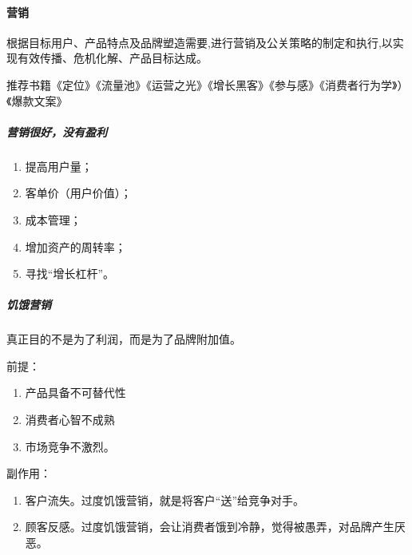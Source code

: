 \documentclass[letterpaper,10pt,english]{sphinxmanual}
\begin{document}
\paragraph{营销}
\label{\detokenize{chapter_idea/GTM:id17}}
根据目标用户、产品特点及品牌塑造需要,进行营销及公关策略的制定和执行,以实现有效传播、危机化解、产品目标达成。%
\begin{footnote}[473]\sphinxAtStartFootnote
{}
%
\end{footnote}

推荐书籍《定位》《流量池》《运营之光》《增长黑客》《参与感》《消费者行为学》）《爆款文案》%
\begin{footnote}[474]\sphinxAtStartFootnote
{}
%
\end{footnote}


\subparagraph{营销很好，没有盈利}
\label{\detokenize{chapter_idea/GTM:id18}}\begin{enumerate}
%
\item {} 
提高用户量；

\item {} 
客单价（用户价值）；

\item {} 
成本管理；

\item {} 
增加资产的周转率；

\item {} 
寻找“增长杠杆”。

\end{enumerate}


\subparagraph{饥饿营销}
\label{\detokenize{chapter_idea/GTM:id19}}
真正目的不是为了利润，而是为了品牌附加值。

前提：
\begin{enumerate}
%
\item {} 
产品具备不可替代性

\item {} 
消费者心智不成熟

\item {} 
市场竞争不激烈。

\end{enumerate}

副作用：
\begin{enumerate}
%
\item {} 
客户流失。过度饥饿营销，就是将客户“送”给竞争对手。

\item {} 
顾客反感。过度饥饿营销，会让消费者饿到冷静，觉得被愚弄，对品牌产生厌恶。

\end{enumerate}
\end{document}
